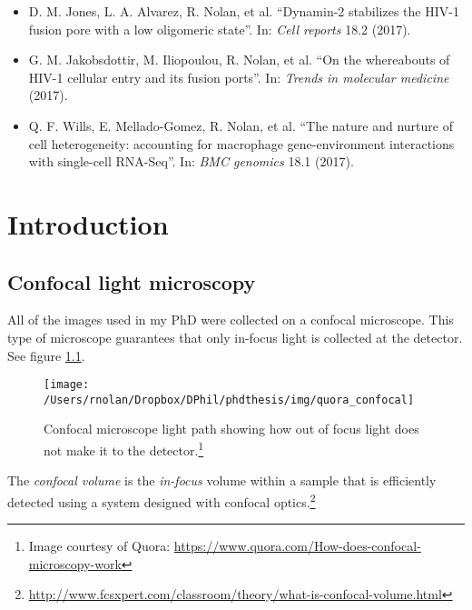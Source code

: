 \documentclass[12pt,]{book}
\providecommand{\tightlist}{%
  \setlength{\itemsep}{0pt}\setlength{\parskip}{0pt}}
\let\rmarkdownfootnote\footnote%
\def\footnote{\protect\rmarkdownfootnote}
\theoremstyle{definition}
\theoremstyle{definition}
\theoremstyle{definition}
\theoremstyle{remark}
\let\BeginKnitrBlock\begin \let\EndKnitrBlock\end
\begin{document}
\begin{itemize}
\tightlist
\item
  D. M. Jones, L. A. Alvarez, R. Nolan, et al. ``Dynamin-2 stabilizes
  the HIV-1 fusion pore with a low oligomeric state''. In: \emph{Cell
  reports} 18.2 (2017).
\item
  G. M. Jakobsdottir, M. Iliopoulou, R. Nolan, et al. ``On the
  whereabouts of HIV-1 cellular entry and its fusion ports''. In:
  \emph{Trends in molecular medicine} (2017).
\item
  Q. F. Wills, E. Mellado-Gomez, R. Nolan, et al. ``The nature and
  nurture of cell heterogeneity: accounting for macrophage
  gene-environment interactions with single-cell RNA-Seq''. In:
  \emph{BMC genomics} 18.1 (2017).
\end{itemize}

\chapter{Introduction}\label{intro}

\section{Confocal light microscopy}\label{confocal-light-microscopy}

All of the images used in my PhD were collected on a confocal
microscope. This type of microscope guarantees that only in-focus light
is collected at the detector. See figure \ref{fig:confocal}.





\begin{figure}

\texttt{[image: /Users/rnolan/Dropbox/DPhil/phdthesis/img/quora\_confocal]} \hfill{}

\caption{Confocal microscope light path showing how out of
focus light does not make it to the detector.\footnote{Image courtesy of
  Quora: \url{https://www.quora.com/How-does-confocal-microscopy-work}}}\label{fig:confocal}
\end{figure}

\BeginKnitrBlock{definition}
\protect\hypertarget{def:unnamed-chunk-1}{}{\label{def:unnamed-chunk-1} }The
\emph{confocal volume} is the \emph{in-focus} volume within a sample
that is efficiently detected using a system designed with confocal
optics.\footnote{\url{http://www.fcsxpert.com/classroom/theory/what-is-confocal-volume.html}}
\EndKnitrBlock{definition}
\end{document}
